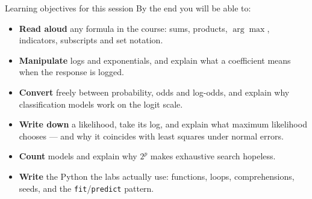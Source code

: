 \documentclass[aspectratio=169,11pt]{beamer}
\begin{document}
\begin{frame}{Learning objectives for this session}
  By the end you will be able to:
  \begin{itemize}
    \item \textbf{Read aloud} any formula in the course: sums, products,
          $\arg\max$, indicators, subscripts and set notation.
    \item \textbf{Manipulate} logs and exponentials, and explain what a
          coefficient means when the response is logged.
    \item \textbf{Convert} freely between probability, odds and log-odds, and
          explain why classification models work on the logit scale.
    \item \textbf{Write down} a likelihood, take its log, and explain what
          maximum likelihood chooses --- and why it coincides with least
          squares under normal errors.
    \item \textbf{Count} models and explain why $2^p$ makes exhaustive search
          hopeless.
    \item \textbf{Write} the Python the labs actually use: functions, loops,
          comprehensions, seeds, and the \texttt{fit}/\texttt{predict} pattern.
  \end{itemize}
\end{frame}
\end{document}
